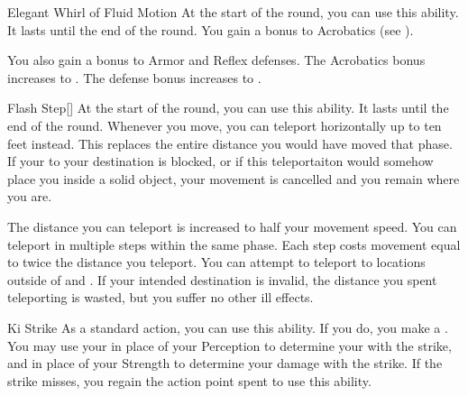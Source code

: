 {            \begin{ability}{Elegant Whirl of Fluid Motion}
                At the start of the round, you can use this ability.
                It lasts until the end of the round.
                You gain a  bonus to Acrobatics (see ).

                \rankline
                 You also gain a  bonus to Armor and Reflex defenses.
                 The Acrobatics bonus increases to .
                 The defense bonus increases to .
            \end{ability}

            \begin{ability}{Flash Step}[]
                At the start of the round, you can use this ability.
                It lasts until the end of the round.
                Whenever you move, you can teleport horizontally up to ten feet instead.
                This replaces the entire distance you would have moved that phase.
                If your  to your destination is blocked, or if this teleportaiton would somehow place you inside a solid object, your movement is cancelled and you remain where you are.

                \rankline
                 The distance you can teleport is increased to half your movement speed.
                 You can teleport in multiple steps within the same phase.
                Each step costs movement equal to twice the distance you teleport.
                 You can attempt to teleport to locations outside of  and .
                If your intended destination is invalid, the distance you spent teleporting is wasted, but you suffer no other ill effects.
            \end{ability}

            \begin{ability}{Ki Strike}
                As a standard action, you can use this ability.
                If you do, you make a .
                You may use your  in place of your Perception to determine your  with the strike, and in place of your Strength to determine your damage with the strike.
                If the strike misses, you regain the action point spent to use this ability.


\end{ability}}
